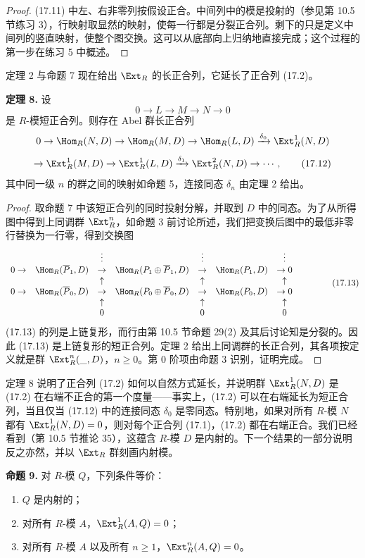 \begin{proof}
(17.11) 中左、右非零列按假设正合。中间列中的模是投射的（参见第 10.5 节练习 3），行映射取显然的映射，使每一行都是分裂正合列。剩下的只是定义中间列的竖直映射，使整个图交换。这可以从底部向上归纳地直接完成；这个过程的第一步在练习 5 中概述。
\end{proof}

定理 2 与命题 7 现在给出 $\Ext_R$ 的长正合列，它延长了正合列 (17.2)。

\medskip
\noindent\textbf{定理 8.} 设
\[
  0\to L\to M\to N\to0
\]
是 $R$-模短正合列。则存在 Abel 群长正合列
\[
0\to\Hom_R(N,D)\to\Hom_R(M,D)\to\Hom_R(L,D)\xrightarrow{\delta_0}\Ext_R^1(N,D)
\]
\[
\to\Ext_R^1(M,D)\to\Ext_R^1(L,D)\xrightarrow{\delta_1}\Ext_R^2(N,D)\to\cdots ,
\tag{17.12}
\]
其中同一级 $n$ 的群之间的映射如命题 5，连接同态 $\delta_n$ 由定理 2 给出。

\begin{proof}
取命题 7 中该短正合列的同时投射分解，并取到 $D$ 中的同态。为了从所得图中得到上同调群 $\Ext_R^n$，如命题 3 前讨论所述，我们把变换后图中的最低非零行替换为一行零，得到交换图
\[
\begin{array}{ccccccccc}
&&\vdots&&\vdots&&\vdots&&\\
0\to&\Hom_R(\overline P_1,D)&\to&\Hom_R(P_1\oplus\overline P_1,D)&\to&\Hom_R(P_1,D)&\to0\\
&&\uparrow&&\uparrow&&\uparrow&&\\
0\to&\Hom_R(\overline P_0,D)&\to&\Hom_R(P_0\oplus\overline P_0,D)&\to&\Hom_R(P_0,D)&\to0\\
&&\uparrow&&\uparrow&&\uparrow&&\\
&&0&&0&&0&&
\end{array}
\tag{17.13}
\]
(17.13) 的列是上链复形，而行由第 10.5 节命题 29(2) 及其后讨论知是分裂的。因此 (17.13) 是上链复形的短正合列。定理 2 给出上同调群的长正合列，其各项按定义就是群 $\Ext_R^n(\_,D)$，$n\geq0$。第 $0$ 阶项由命题 3 识别，证明完成。
\end{proof}

定理 8 说明了正合列 (17.2) 如何以自然方式延长，并说明群 $\Ext_R^1(N,D)$ 是 (17.2) 在右端不正合的第一个度量——事实上，(17.2) 可以在右端延长为短正合列，当且仅当 (17.12) 中的连接同态 $\delta_0$ 是零同态。特别地，如果对所有 $R$-模 $N$ 都有 $\Ext_R^1(N,D)=0$，则对每个正合列 (17.1)，(17.2) 都在右端正合。我们已经看到（第 10.5 节推论 35），这蕴含 $R$-模 $D$ 是内射的。下一个结果的一部分说明反之亦然，并以 $\Ext_R$ 群刻画内射模。

\medskip
\noindent\textbf{命题 9.} 对 $R$-模 $Q$，下列条件等价：
\begin{enumerate}[label=(\arabic*)]
  \item $Q$ 是内射的；
  \item 对所有 $R$-模 $A$，$\Ext_R^1(A,Q)=0$；
  \item 对所有 $R$-模 $A$ 以及所有 $n\geq1$，$\Ext_R^n(A,Q)=0$。
\end{enumerate}

